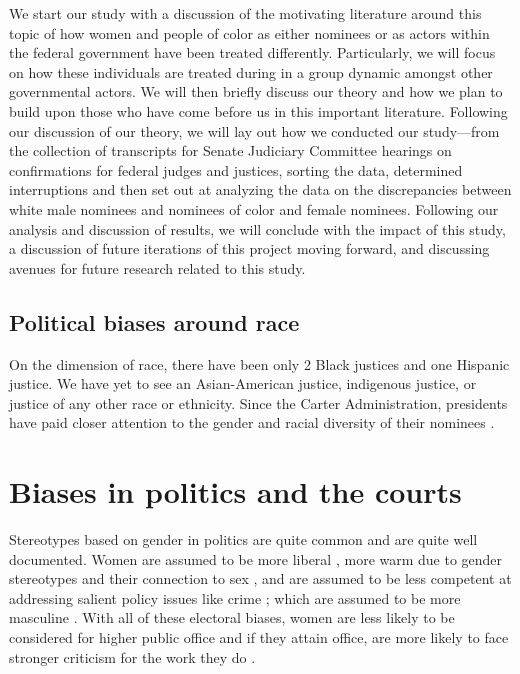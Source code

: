 \documentclass [12pt]{article}
\begin{document}
We start our study with a discussion of the motivating literature around this topic of how women and people of color as either nominees or as actors within the federal government have been treated differently. Particularly, we will focus on how these individuals are treated during in a group dynamic amongst other governmental actors. We will then briefly discuss our theory and how we plan to build upon those who have come before us in this important literature. Following our discussion of our theory, we will lay out how we conducted our study—from the collection of transcripts for Senate Judiciary Committee hearings on confirmations for federal judges and justices, sorting the data, determined interruptions and then set out at analyzing the data on the discrepancies between white male nominees and nominees of color and female nominees. Following our analysis and discussion of results, we will conclude with the impact of this study, a discussion of future iterations of this project moving forward, and discussing avenues for future research related to this study. 

	\subsection{Political biases around race}
On the dimension of race, there have been only 2 Black justices and one Hispanic justice. We have yet to see an Asian-American justice, indigenous justice, or justice of any other race or ethnicity. Since the Carter Administration, presidents have paid closer attention to the gender and racial diversity of their nominees \citep{Kastellec2013}. 

\section{Biases in politics and the courts}

Stereotypes based on gender in politics are quite common and are quite well documented. Women are assumed to be more liberal \citep{mcdermott_1997}, more warm due to gender stereotypes and their connection to sex \citep{laustsen_bor_2017}, and are assumed to be less competent at addressing salient policy issues like crime \citep{huddy_terkildsen_1993, sanbonmmatsu_dolan_2009}; which are assumed to be more masculine \citep{holman_et-al_2016}. With all of these electoral biases, women are less likely to be considered for higher public office \citep{oliver_conroy_2020} and if they attain office, are more likely to face stronger criticism for the work they do \citep{lazarus_steigerwalt_2020}.
\end{document}
